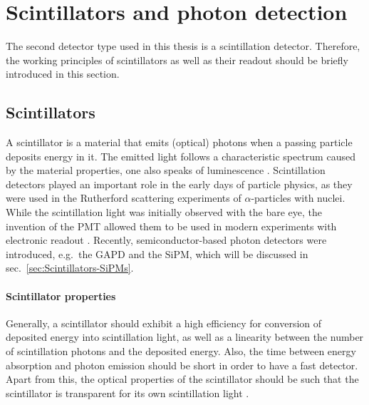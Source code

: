 \FloatBarrier
\section{Scintillators and photon detection}
\label{sec:Scintillators}
The second detector type used in this thesis is a scintillation detector. Therefore, the working principles of scintillators as well as their readout should be briefly introduced in this section.

\subsection{Scintillators}
\label{sec:Scintillators-Scintillators}
A scintillator is a material that emits (optical) photons when a passing particle deposits energy in it. The emitted light follows a characteristic spectrum caused by the material properties, one also speaks of luminescence \cite{Book-KolanoskiWermes}. Scintillation detectors played an important role in the early days of particle physics, as they were used in the Rutherford scattering experiments of $\alpha$-particles with nuclei. While the scintillation light was initially observed with the bare eye, the invention of the \ac{PMT} allowed them to be used in modern experiments with electronic readout \cite{Book-Leo}. Recently, semiconductor-based photon detectors were introduced, e.g.\ the \ac{GAPD} and the \ac{SiPM}, which will be discussed in sec.\ \ref{sec:Scintillators-SiPMs}. 
\paragraph{Scintillator properties}
Generally, a scintillator should exhibit a high efficiency for conversion of deposited energy into scintillation light, as well as a linearity between the number of scintillation photons and the deposited energy. Also, the time between energy absorption and photon emission should be short in order to have a fast detector. Apart from this, the optical properties of the scintillator should be such that the scintillator is transparent for its own scintillation light \cite{Book-KolanoskiWermes}.
